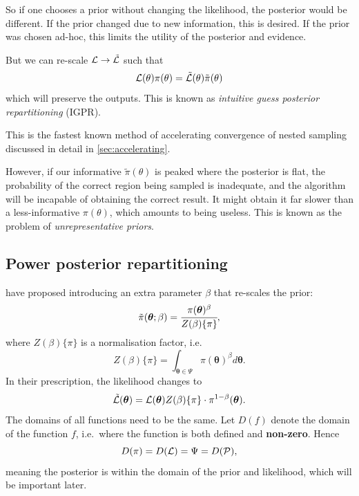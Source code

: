 \documentclass[usenatbib]{mnras}
\begin{document}
So if one chooses a prior without changing the likelihood, the
posterior would be different. If the prior changed due to new
information, this is desired. If the prior was chosen ad-hoc, this
limits the utility of the posterior and evidence.

But we can re-scale ${\cal L} \rightarrow \tilde{\cal L}$ such that
\begin{equation}
  \label{eq:idea-repart}
{\cal L}(\theta)\pi(\theta)= \tilde{\cal L}(\theta) \tilde{\pi}(\theta)
\end{equation}
which will preserve the outputs.  This is known as \emph{intuitive guess posterior repartitioning} (IGPR).

This is the fastest known method of accelerating convergence of nested sampling discussed in detail in \cref{sec:accelerating}. 

However, if our informative $\tilde{\pi}(\theta)$ is peaked where the
posterior is flat, the probability of the correct region being sampled
is inadequate, and the algorithm will be incapable of obtaining the
correct result. It might obtain it far slower than a less-informative
$\pi(\theta)$, which amounts to being useless. This is known as the
problem of \emph{unrepresentative priors}.


\subsection{Power posterior repartitioning}\label{sec:org68fff63}

\citeauthor{chen-ferroz-hobson} have proposed introducing an
extra parameter \(\beta\) that re-scales the prior:
\begin{equation*}
  \tilde{\pi}(\bm{\bm{\theta}};\beta) = \cfrac{\pi(\bm{\theta})^{\beta}}{Z(\beta)\{\pi\}},
\end{equation*}
where \(Z(\beta)\{\pi\}\) is a normalisation factor, i.e. 
\begin{equation*}
  Z(\beta)\{\pi\} = \int_{\bm{\theta} \in \Psi} \pi(\bm{\bm{\theta}})^{\beta}d\bm{\bm{\theta}}.
\end{equation*}
In their prescription, the likelihood changes to
\begin{equation*}
  \tilde{\cal L}(\bm{\theta}) = {\cal L}(\bm{\theta}) Z(\beta)\{\pi\} \cdot \pi^{1-\beta}(\bm{\theta}).
\end{equation*}
The domains of all functions need to be the same. Let
\(D(f)\) denote the domain of the function \(f\), i.e.~where the
function is both defined and \textbf{non-zero}. Hence
\begin{equation*}
  D(\pi) = D({\cal L}) = \Psi = D({\cal P}),
\end{equation*} 
meaning the posterior is within the domain of the prior and
likelihood, which will be important later.\label{domain-discussion}
\end{document}
